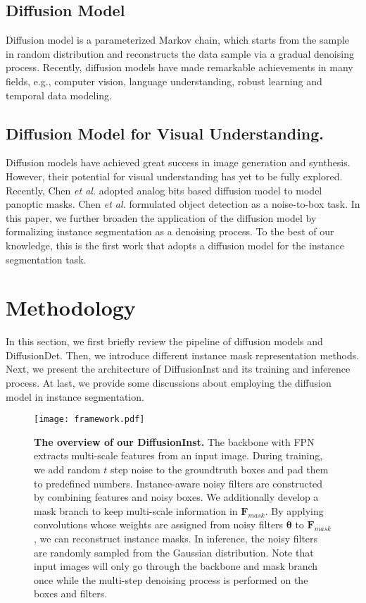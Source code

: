 \documentclass{article}
\begin{document}
\subsection{Diffusion Model}
Diffusion model\cite{DDPM,SGM,GMDD} is a parameterized Markov chain, which starts from the sample in random distribution and reconstructs the data sample via a gradual denoising process. Recently, diffusion models have made remarkable achievements in many fields, e.g., computer vision\cite{CascadedDiff,LDM,LDEM,3DDiff}, language understanding\cite{DiffLM,D3PM,Diffuseq}, robust learning\cite{GDM_Adv,DiffPure} and temporal data modeling\cite{NMC_SDE,DiffWave}.

\subsection{Diffusion Model for Visual Understanding.}
Diffusion models have achieved great success in image generation and synthesis\cite{Prafullanips,DDPM,GMDD}. However, their potential for visual understanding has yet to be fully explored. Recently, Chen \textit{et al.}\cite{DiffSeg} adopted analog bits based diffusion model\cite{BitDiff} to model panoptic masks. Chen \textit{et al.}\cite{DiffusionDet} formulated object detection as a noise-to-box task. In this paper, we further broaden the application of the diffusion model by formalizing instance segmentation as a denoising process. To the best of our knowledge, this is the first work that adopts a diffusion model for the instance segmentation task.

\section{Methodology}
In this section, we first briefly review the pipeline of diffusion models and DiffusionDet\cite{DiffusionDet}. Then, we introduce different instance mask representation methods. Next, we present the architecture of DiffusionInst and its training and inference process. At last, we provide some discussions about employing the diffusion model in instance segmentation.
\begin{figure*}[t]
\centering
\texttt{[image: framework.pdf]}
\caption{\textbf{The overview of our DiffusionInst.} The backbone with FPN extracts multi-scale features from an input image. During training, we add random $t$ step noise to the groundtruth boxes and pad them to predefined numbers. Instance-aware noisy filters are constructed by combining features and noisy boxes. We additionally develop a mask branch to keep multi-scale information in $\mathbf{F}_{mask}$. By applying convolutions whose weights are assigned from noisy filters $\bm{\theta}$ to $\mathbf{F}_{mask}$, we can reconstruct instance masks. In inference, the noisy filters are randomly sampled from the Gaussian distribution. Note that input images will only go through the backbone and mask branch once while the multi-step denoising process is performed on the boxes and filters.}
\label{framework}
\end{figure*}
\end{document}
